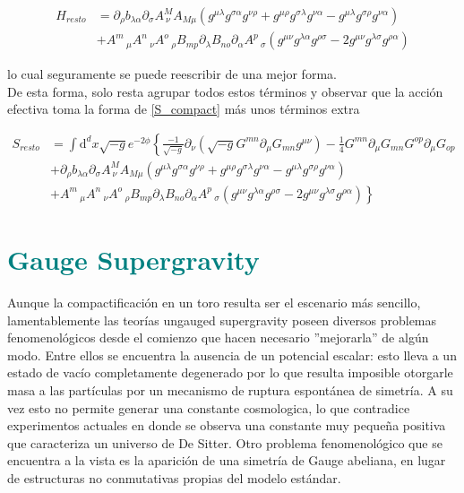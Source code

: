 \documentclass{article}
\numberwithin{equation}{section}
\begin{document}
\begin{equation}
\begin{aligned}
H_{resto} &= \partial_{\rho}{b_{\lambda \alpha}} \partial_{\sigma}{A^M_{\ \nu}} A_{M \mu}\left( g^{\mu \lambda} g^{\sigma \alpha} g^{\nu \rho} + g^{\mu \rho} g^{\sigma \lambda} g^{\nu \alpha} - g^{\mu \lambda} g^{\sigma \rho} g^{\nu \alpha} \right)\\
&+ A^{m}\,_{\mu} A^{n}\,_{\nu} A^{o}\,_{\rho}  B_{m p} \partial_{\lambda}{B_{n o}} \partial_{\alpha}{A^{p}\,_{\sigma}}  \left( g^{\mu \nu} g^{\lambda \alpha} g^{\rho \sigma}  - 2 g^{\mu \nu} g^{\lambda \sigma} g^{\rho \alpha} \right) 
\end{aligned}
\end{equation}

lo cual seguramente se puede reescribir de una mejor forma.\\

De esta forma, solo resta agrupar todos estos términos y observar que la acción efectiva toma la forma de \ref{S_compact} más unos términos extra

\begin{equation}
\begin{aligned}
S_{resto} &= \int \mathrm{d}^d x\sqrt{-g}e^{-2 \phi} \left\{  \frac{-1}{\sqrt{-g}} \partial_{\nu} \left( \sqrt{-g} G^{m n} \partial_{\mu}{G_{m n}} g^{\mu \nu} \right) - \frac{1}{4} G^{m n} \partial_{\mu}{G_{m n}} G^{o p} \partial_{\mu}{G_{o p}}\right.\\
& + \partial_{\rho}{b_{\lambda \alpha}} \partial_{\sigma}{A^M_{\ \nu}} A_{M \mu}\left( g^{\mu \lambda} g^{\sigma \alpha} g^{\nu \rho} + g^{\mu \rho} g^{\sigma \lambda} g^{\nu \alpha} - g^{\mu \lambda} g^{\sigma \rho} g^{\nu \alpha} \right)\\
& \left.+ A^{m}\,_{\mu} A^{n}\,_{\nu} A^{o}\,_{\rho}  B_{m p} \partial_{\lambda}{B_{n o}} \partial_{\alpha}{A^{p}\,_{\sigma}}  \left( g^{\mu \nu} g^{\lambda \alpha} g^{\rho \sigma}  - 2 g^{\mu \nu} g^{\lambda \sigma} g^{\rho \alpha} \right) \right\}
\end{aligned}
\end{equation}

\section{\textcolor{teal}{Gauge Supergravity}}\label{sec_gaugedsugra}

Aunque la compactificación en un toro resulta ser el escenario más sencillo, lamentablemente las teorías ungauged supergravity poseen diversos problemas fenomenológicos desde el comienzo que hacen necesario ''mejorarla'' de algún modo. Entre ellos se encuentra la ausencia de un potencial escalar: esto lleva a un estado de vacío completamente degenerado por lo que resulta imposible otorgarle masa a las partículas por un mecanismo de ruptura espontánea de simetría. A su vez esto no permite generar una constante cosmologica, lo que contradice experimentos actuales en donde se observa una constante muy pequeña positiva que caracteriza un universo de De Sitter. Otro problema fenomenológico que se encuentra a la vista es la aparición de una simetría de Gauge abeliana, en lugar de estructuras no conmutativas propias del modelo estándar. 
\end{document}
